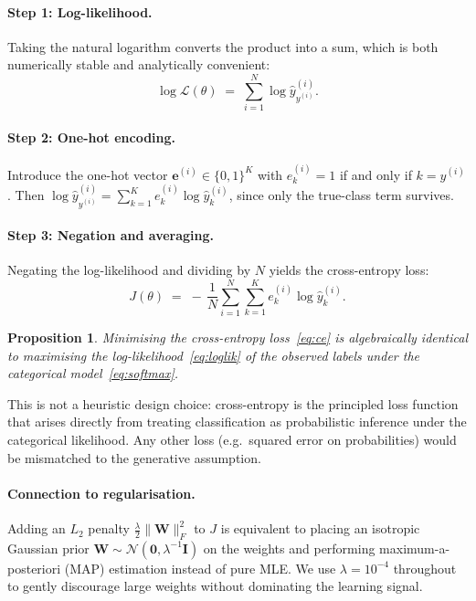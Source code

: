 \documentclass[11pt]{article}
\newcommand{\bW}{\mathbf{W}}
\newtheorem{proposition}{Proposition}
\begin{document}
\paragraph{Step 1: Log-likelihood.}
Taking the natural logarithm converts the product into a sum, which is both numerically
stable and analytically convenient:
\begin{equation}\label{eq:loglik}
  \log\mathcal{L}(\theta)
  \;=\;\sum_{i=1}^{N} \log \hat{y}_{y^{(i)}}^{(i)}.
\end{equation}

\paragraph{Step 2: One-hot encoding.}
Introduce the one-hot vector $\mathbf{e}^{(i)}\in\{0,1\}^K$ with $e^{(i)}_k = 1$ if and
only if $k = y^{(i)}$.  Then $\log \hat{y}_{y^{(i)}}^{(i)} = \sum_{k=1}^{K} e^{(i)}_k
\log \hat{y}^{(i)}_k$, since only the true-class term survives.

\paragraph{Step 3: Negation and averaging.}
Negating the log-likelihood and dividing by $N$ yields the cross-entropy loss:
\begin{equation}\label{eq:ce}
  J(\theta) \;=\; -\,\frac{1}{N}\sum_{i=1}^{N}\sum_{k=1}^{K}
  e_k^{(i)}\log\hat{y}_k^{(i)}.
\end{equation}

\begin{proposition}
Minimising the cross-entropy loss~\eqref{eq:ce} is algebraically identical to maximising
the log-likelihood~\eqref{eq:loglik} of the observed labels under the categorical
model~\eqref{eq:softmax}.
\end{proposition}

This is not a heuristic design choice: cross-entropy is the principled loss function that
arises directly from treating classification as probabilistic inference under the
categorical likelihood.  Any other loss (e.g.\ squared error on probabilities) would be
mismatched to the generative assumption.

\paragraph{Connection to regularisation.}
Adding an $L_2$ penalty $\frac{\lambda}{2}\|\bW\|_F^2$ to $J$ is equivalent to placing an
isotropic Gaussian prior $\bW\sim\mathcal{N}(\mathbf{0},\lambda^{-1}\mathbf{I})$ on the
weights and performing maximum-a-posteriori (MAP) estimation instead of pure MLE.
We use $\lambda=10^{-4}$ throughout to gently discourage large weights without dominating
the learning signal.
\end{document}
